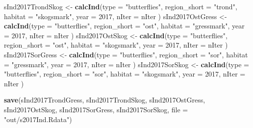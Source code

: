 \documentclass[]{article}
\newenvironment{Shaded}{\begin{snugshade}}{\end{snugshade}}
\newcommand{\KeywordTok}[1]{\textcolor[rgb]{0.13,0.29,0.53}{\textbf{#1}}}
\newcommand{\DataTypeTok}[1]{\textcolor[rgb]{0.13,0.29,0.53}{#1}}
\newcommand{\DecValTok}[1]{\textcolor[rgb]{0.00,0.00,0.81}{#1}}
\newcommand{\StringTok}[1]{\textcolor[rgb]{0.31,0.60,0.02}{#1}}
\newcommand{\NormalTok}[1]{#1}
\begin{document}
\begin{Shaded}
\begin{Highlighting}[]
\NormalTok{sInd2017TrondSkog <-}\StringTok{ }\KeywordTok{calcInd}\NormalTok{(}\DataTypeTok{type =} \StringTok{"butterflies"}\NormalTok{,}
                              \DataTypeTok{region_short =} \StringTok{"trond"}\NormalTok{,}
                              \DataTypeTok{habitat =} \StringTok{"skogsmark"}\NormalTok{,}
                              \DataTypeTok{year =} \DecValTok{2017}\NormalTok{,}
                              \DataTypeTok{nIter =}\NormalTok{ nIter}
\NormalTok{                              )}
\NormalTok{sInd2017OstGress <-}\StringTok{ }\KeywordTok{calcInd}\NormalTok{(}\DataTypeTok{type =} \StringTok{"butterflies"}\NormalTok{,}
                              \DataTypeTok{region_short =} \StringTok{"ost"}\NormalTok{,}
                              \DataTypeTok{habitat =} \StringTok{"gressmark"}\NormalTok{,}
                              \DataTypeTok{year =} \DecValTok{2017}\NormalTok{,}
                              \DataTypeTok{nIter =}\NormalTok{ nIter}
\NormalTok{                              )}
\NormalTok{sInd2017OstSkog <-}\StringTok{ }\KeywordTok{calcInd}\NormalTok{(}\DataTypeTok{type =} \StringTok{"butterflies"}\NormalTok{,}
                              \DataTypeTok{region_short =} \StringTok{"ost"}\NormalTok{,}
                              \DataTypeTok{habitat =} \StringTok{"skogsmark"}\NormalTok{,}
                              \DataTypeTok{year =} \DecValTok{2017}\NormalTok{,}
                              \DataTypeTok{nIter =}\NormalTok{ nIter}
\NormalTok{                              )}
\NormalTok{sInd2017SorGress <-}\StringTok{ }\KeywordTok{calcInd}\NormalTok{(}\DataTypeTok{type =} \StringTok{"butterflies"}\NormalTok{,}
                              \DataTypeTok{region_short =} \StringTok{"sor"}\NormalTok{,}
                              \DataTypeTok{habitat =} \StringTok{"gressmark"}\NormalTok{,}
                              \DataTypeTok{year =} \DecValTok{2017}\NormalTok{,}
                              \DataTypeTok{nIter =}\NormalTok{ nIter}
\NormalTok{                              )}
\NormalTok{sInd2017SorSkog <-}\StringTok{ }\KeywordTok{calcInd}\NormalTok{(}\DataTypeTok{type =} \StringTok{"butterflies"}\NormalTok{,}
                              \DataTypeTok{region_short =} \StringTok{"sor"}\NormalTok{,}
                              \DataTypeTok{habitat =} \StringTok{"skogsmark"}\NormalTok{,}
                              \DataTypeTok{year =} \DecValTok{2017}\NormalTok{,}
                              \DataTypeTok{nIter =}\NormalTok{ nIter}
\NormalTok{                              )}


\KeywordTok{save}\NormalTok{(sInd2017TrondGress, sInd2017TrondSkog, sInd2017OstGress, sInd2017OstSkog, sInd2017SorGress, sInd2017SorSkog, }\DataTypeTok{file =} \StringTok{"out/s2017Ind.Rdata"}\NormalTok{)}
\end{Highlighting}
\end{Shaded}
\end{document}
